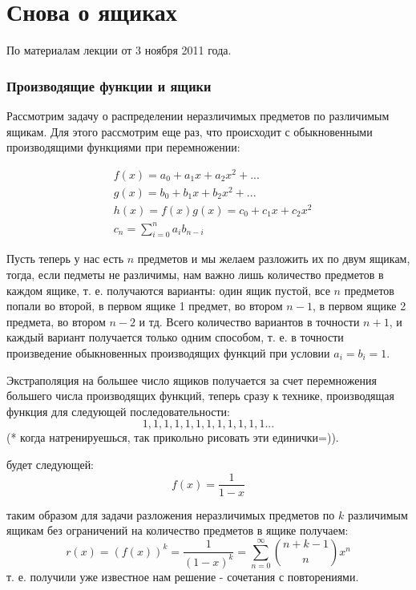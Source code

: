 \chapter{Снова о ящиках}

По материалам лекции от 3 ноября 2011 года.

\subsection{Производящие функции и ящики}

Рассмотрим задачу о распределении неразличимых предметов по различимым ящикам. Для этого рассмотрим еще раз, что происходит с обыкновенными производящими функциями при перемножении:

\[
	\begin{split}
		& f\left(x\right) = a_0 + a_1 x + a_2 x^2 + ... \\
		& g\left(x\right) = b_0 + b_1 x + b_2 x^2 + ... \\
		& h\left(x\right) = f\left(x\right) g\left(x\right) = c_0 + c_1 x + c_2 x^2 \\
		& c_n = \sum_{i=0}^n a_i b_{n-i}
	\end{split}
\]

Пусть теперь у нас есть $n$ предметов и мы желаем разложить их по двум ящикам, тогда, если педметы не различимы, нам важно лишь количество предметов в каждом ящике, т. е. получаются варианты: один ящик пустой, все $n$ предметов попали во второй, в первом ящике 1 предмет, во втором $n-1$, в первом ящике 2 предмета, во втором $n-2$ и тд. Всего количество вариантов в точности $n+1$, и каждый вариант получается только одним способом, т. е. в точности произведение обыкновенных производящих функций при условии $a_i = b_i = 1$.

Экстраполяция на большее число ящиков получается за счет перемножения большего числа производящих функций, теперь сразу к технике, производящая функция для следующей последовательности:
\[
	1, 1, 1, 1, 1, 1, 1, 1, 1, 1, 1, 1 ...
\]
(* когда натренируешься, так прикольно рисовать эти единички=)).

будет следующей:
\[
	f\left(x\right) = \frac{1}{1-x}
\]

таким образом для задачи разложения неразличимых предметов по $k$ различимым ящикам без ограничений на количество предметов в ящике получаем:
\[
	r\left(x\right) = \left(f\left(x\right)\right)^k = \frac{1}{\left(1-x\right)^k} = \sum_{n=0}^{\infty} \binom{n+k-1}{n} x^n
\]
т. е. получили уже известное нам решение - сочетания с повторениями.

